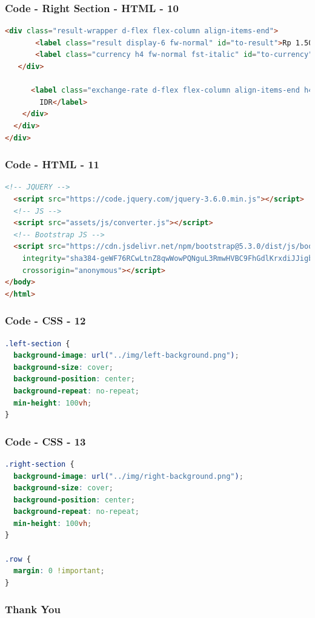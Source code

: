 \documentclass[aspectratio=169, table]{beamer}
\begin{document}
\begin{frame}[fragile]
    \frametitle{Code - Right Section - HTML - 10}
    \vskip1cm
    \begin{lstlisting}[language=HTML]
   <div class="result-wrapper d-flex flex-column align-items-end">
       <label class="result display-6 fw-normal" id="to-result">Rp 1.500.000</label>
       <label class="currency h4 fw-normal fst-italic" id="to-currency">IDR</label>
   </div>
      
      <label class="exchange-rate d-flex flex-column align-items-end h4 fw-normal" id="exchange-rate">1 USD = 15.000
        IDR</label>
    </div>
  </div>
</div>
    \end{lstlisting}
\end{frame}

\begin{frame}[fragile]
    \frametitle{Code - HTML - 11}
    \vskip1cm
    \begin{lstlisting}[language=HTML]
  <!-- JQUERY -->
  <script src="https://code.jquery.com/jquery-3.6.0.min.js"></script>
  <!-- JS -->
  <script src="assets/js/converter.js"></script>
  <!-- Bootstrap JS -->
  <script src="https://cdn.jsdelivr.net/npm/bootstrap@5.3.0/dist/js/bootstrap.bundle.min.js"
    integrity="sha384-geWF76RCwLtnZ8qwWowPQNguL3RmwHVBC9FhGdlKrxdiJJigb/j/68SIy3Te4Bkz"
    crossorigin="anonymous"></script>
</body>
</html>
    \end{lstlisting}
\end{frame}

\begin{frame}[fragile]
    \frametitle{Code - CSS - 12}
    \vskip1cm
    \begin{lstlisting}[language=CSS]
.left-section {
  background-image: url("../img/left-background.png");
  background-size: cover;
  background-position: center;
  background-repeat: no-repeat;
  min-height: 100vh;
}
    \end{lstlisting}
\end{frame}

\begin{frame}[fragile]
    \frametitle{Code - CSS - 13}
    \vskip1cm
    \begin{lstlisting}[language=CSS]
.right-section {
  background-image: url("../img/right-background.png");
  background-size: cover;
  background-position: center;
  background-repeat: no-repeat;
  min-height: 100vh;
}

.row {
  margin: 0 !important;
}
    \end{lstlisting}
\end{frame}


\begin{frame4}
    \frametitle{Thank You}
\end{frame4}
\end{document}
